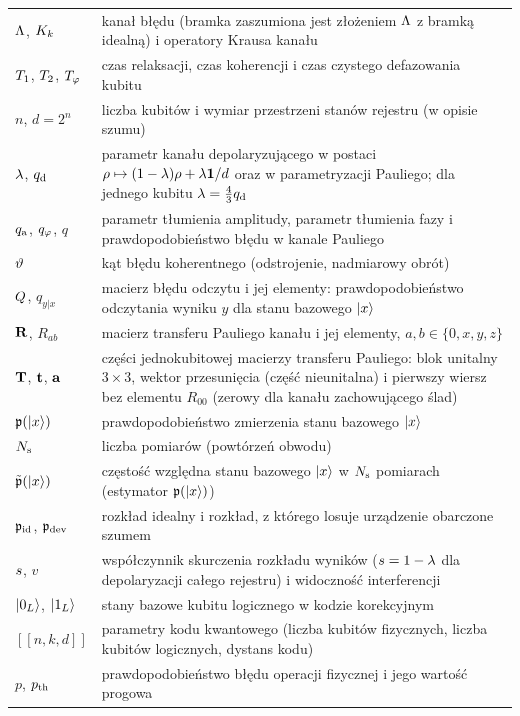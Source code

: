 \begin{longtable}{@{}p{}p{}@{}}
$\Lambda$, $K_k$ & kanał błędu (bramka zaszumiona jest złożeniem $\Lambda$ z bramką idealną) i operatory Krausa kanału \\
$T_1$, $T_2$, $T_{\varphi}$ & czas relaksacji, czas koherencji i czas czystego defazowania kubitu \\
$n$, $d=2^n$ & liczba kubitów i wymiar przestrzeni stanów rejestru (w opisie szumu) \\
$\lambda$, $q_{\mathrm{d}}$ & parametr kanału depolaryzującego w postaci $\rho\mapsto(1-\lambda)\rho+\lambda\mathbf{1}/d$ oraz w parametryzacji Pauliego; dla jednego kubitu $\lambda=\frac{4}{3}q_{\mathrm{d}}$ \\
$q_{\mathrm{a}}$, $q_{\varphi}$, $q$ & parametr tłumienia amplitudy, parametr tłumienia fazy i prawdopodobieństwo błędu w kanale Pauliego \\
$\vartheta$ & kąt błędu koherentnego (odstrojenie, nadmiarowy obrót) \\
$Q$, $q_{y|x}$ & macierz błędu odczytu i jej elementy: prawdopodobieństwo odczytania wyniku $y$ dla stanu bazowego $\ket{x}$ \\
$\mathbf{R}$, $R_{ab}$ & macierz transferu Pauliego kanału i jej elementy, $a,b\in\{0,x,y,z\}$ \\
$\mathbf{T}$, $\mathbf{t}$, $\mathbf{a}$ & części jednokubitowej macierzy transferu Pauliego: blok unitalny $3\times3$, wektor przesunięcia (część nieunitalna) i pierwszy wiersz bez elementu $R_{00}$ (zerowy dla kanału zachowującego ślad) \\
$\mathfrak{p}(\ket{x})$ & prawdopodobieństwo zmierzenia stanu bazowego $\ket{x}$ \\
$N_{\mathrm{s}}$ & liczba pomiarów (powtórzeń obwodu) \\
$\tilde{\mathfrak{p}}(\ket{x})$ & częstość względna stanu bazowego $\ket{x}$ w $N_{\mathrm{s}}$ pomiarach (estymator $\mathfrak{p}(\ket{x})$) \\
$\mathfrak{p}_{\mathrm{id}}$, $\mathfrak{p}_{\mathrm{dev}}$ & rozkład idealny i rozkład, z którego losuje urządzenie obarczone szumem \\
$s$, $v$ & współczynnik skurczenia rozkładu wyników ($s=1-\lambda$ dla depolaryzacji całego rejestru) i widoczność interferencji \\
$\ket{0_L}$, $\ket{1_L}$ & stany bazowe kubitu logicznego w kodzie korekcyjnym \\
$[[n,k,d]]$ & parametry kodu kwantowego (liczba kubitów fizycznych, liczba kubitów logicznych, dystans kodu) \\
$p$, $p_{\mathrm{th}}$ & prawdopodobieństwo błędu operacji fizycznej i jego wartość progowa \\

\end{longtable}
